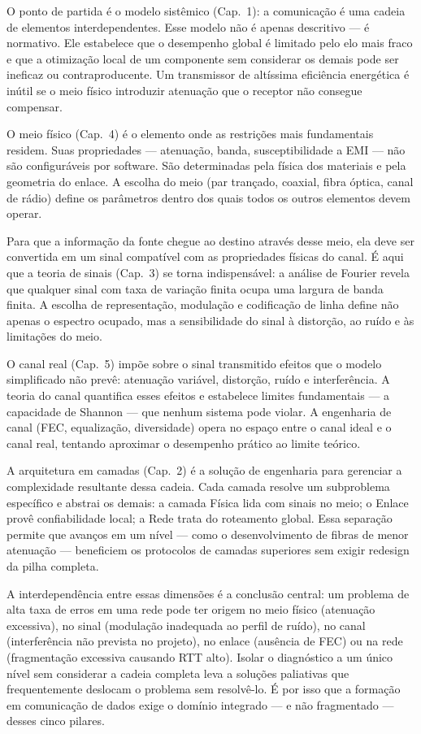\documentclass[conference]{IEEEtran}
\begin{document}
O ponto de partida é o modelo sistêmico (Cap.~1): a comunicação é uma cadeia de elementos
interdependentes. Esse modelo não é apenas descritivo --- é normativo. Ele estabelece que
o desempenho global é limitado pelo elo mais fraco e que a otimização local de um componente
sem considerar os demais pode ser ineficaz ou contraproducente. Um transmissor de altíssima
eficiência energética é inútil se o meio físico introduzir atenuação que o receptor não
consegue compensar.

O meio físico (Cap.~4) é o elemento onde as restrições mais fundamentais residem. Suas
propriedades --- atenuação, banda, susceptibilidade a EMI --- não são configuráveis por
software. São determinadas pela física dos materiais e pela geometria do enlace. A escolha
do meio (par trançado, coaxial, fibra óptica, canal de rádio) define os parâmetros dentro
dos quais todos os outros elementos devem operar.

Para que a informação da fonte chegue ao destino através desse meio, ela deve ser convertida
em um sinal compatível com as propriedades físicas do canal. É aqui que a teoria de sinais
(Cap.~3) se torna indispensável: a análise de Fourier revela que qualquer sinal com taxa de
variação finita ocupa uma largura de banda finita. A escolha de representação, modulação e
codificação de linha define não apenas o espectro ocupado, mas a sensibilidade do sinal à
distorção, ao ruído e às limitações do meio.

O canal real (Cap.~5) impõe sobre o sinal transmitido efeitos que o modelo simplificado não
prevê: atenuação variável, distorção, ruído e interferência. A teoria do canal quantifica
esses efeitos e estabelece limites fundamentais --- a capacidade de Shannon --- que nenhum
sistema pode violar. A engenharia de canal (FEC, equalização, diversidade) opera no espaço
entre o canal ideal e o canal real, tentando aproximar o desempenho prático ao limite teórico.

A arquitetura em camadas (Cap.~2) é a solução de engenharia para gerenciar a complexidade
resultante dessa cadeia. Cada camada resolve um subproblema específico e abstrai os demais:
a camada Física lida com sinais no meio; o Enlace provê confiabilidade local; a Rede trata
do roteamento global. Essa separação permite que avanços em um nível --- como o desenvolvimento
de fibras de menor atenuação --- beneficiem os protocolos de camadas superiores sem exigir
redesign da pilha completa.

A interdependência entre essas dimensões é a conclusão central: um problema de alta taxa de
erros em uma rede pode ter origem no meio físico (atenuação excessiva), no sinal (modulação
inadequada ao perfil de ruído), no canal (interferência não prevista no projeto), no enlace
(ausência de FEC) ou na rede (fragmentação excessiva causando RTT alto). Isolar o diagnóstico
a um único nível sem considerar a cadeia completa leva a soluções paliativas que frequentemente
deslocam o problema sem resolvê-lo. É por isso que a formação em comunicação de dados exige
o domínio integrado --- e não fragmentado --- desses cinco pilares.
\end{document}
